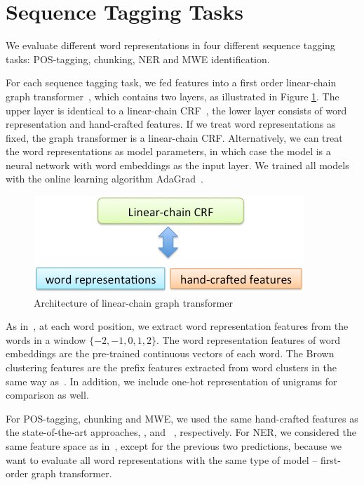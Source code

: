 \section{Sequence Tagging Tasks}
\label{sec:SeqTagging}
We evaluate different word representations in four different sequence tagging tasks: POS-tagging, chunking, NER and MWE identification. 

For each sequence tagging task, we fed features into a first order linear-chain graph
transformer~\cite{collobert2011natural}, which contains two layers, as illustrated in Figure \ref{fig:graph_transformer}. The upper layer is identical to a linear-chain CRF~\cite{lafferty2001conditional}, the lower layer consists of word representation and hand-crafted features. If we treat word representations as fixed, the graph transformer is a linear-chain CRF. Alternatively, we can treat the word representations as model parameters, in which case the model is a neural network with word embeddings as the input layer. We trained all models with the online learning algorithm AdaGrad~\cite{duchi2011adaptive}. 

\begin{figure}[hb]
  \centering
  \includegraphics[scale = 0.3]{images/graph_transformer.png}
  \caption{Architecture of linear-chain graph transformer}
  \label{fig:graph_transformer}
\end{figure}


As in~\cite{turian2010word}, at each word position, we extract word representation features from the words in a window $\{-2, -1, 0, 1, 2\}$. The word representation features of word embeddings are the pre-trained continuous vectors of each word.  The Brown clustering features are the prefix features extracted from word clusters in the same way as~\cite{turian2010word}. In addition, we include one-hot representation of unigrams for comparison as well.

For POS-tagging, chunking and MWE, we used the same hand-crafted features as the state-of-the-art approaches,  ,  and ~, respectively. For NER, we considered the same feature space as in~\cite{turian2010word}, except for the previous two predictions, because we want to evaluate all word representations with the same type of model -- first-order graph transformer.

